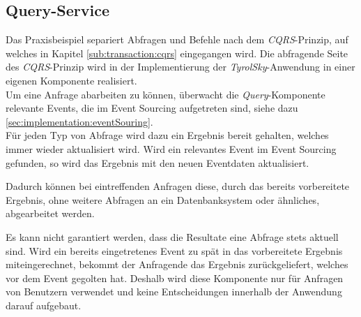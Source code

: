 \subsection{Query-Service}
Das Praxisbeispiel separiert Abfragen und Befehle nach dem \textit{CQRS}-Prinzip, auf welches in Kapitel \ref{sub:transaction:cqrs} eingegangen wird. Die abfragende Seite des \textit{CQRS}-Prinzip wird in der Implementierung der \textit{TyrolSky}-Anwendung in einer eigenen Komponente realisiert. \\
Um eine Anfrage abarbeiten zu können, überwacht die \textit{Query}-Komponente relevante Events, die im Event Sourcing aufgetreten sind, siehe dazu \ref{sec:implementation:eventSouring}. \\
Für jeden Typ von Abfrage wird dazu ein Ergebnis bereit gehalten, welches immer wieder aktualisiert wird. Wird ein relevantes Event im Event Sourcing gefunden, so wird das Ergebnis mit den neuen Eventdaten aktualisiert.

Dadurch können bei eintreffenden Anfragen diese, durch das bereits vorbereitete Ergebnis, ohne weitere Abfragen an ein Datenbanksystem oder ähnliches, abgearbeitet werden. 

Es kann nicht garantiert werden, dass die Resultate eine Abfrage stets aktuell sind. Wird ein bereits eingetretenes Event zu spät in das vorbereitete Ergebnis miteingerechnet, bekommt der Anfragende das Ergebnis zurückgeliefert, welches vor dem Event gegolten hat. Deshalb wird diese Komponente nur für Anfragen von Benutzern verwendet und keine Entscheidungen innerhalb der Anwendung darauf aufgebaut.

